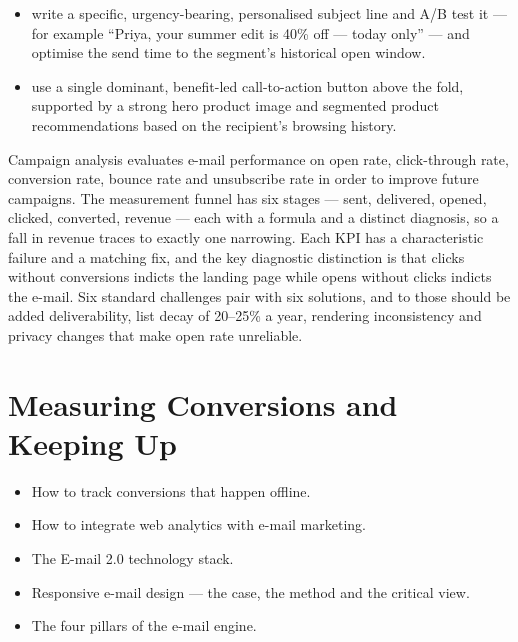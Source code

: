 \begin{exambox}
\begin{itemize}
\item {} write a specific, urgency-bearing,
      personalised subject line and A/B test it --- for example ``Priya, your
      summer edit is 40\% off --- today only'' --- and optimise the send time to
      the segment's historical open window.
\item {} use a single dominant, benefit-led
      call-to-action button above the fold, supported by a strong hero product
      image and segmented product recommendations based on the recipient's
      browsing history.
\end{itemize}
\end{exambox}

\begin{summarybox}
Campaign analysis evaluates e-mail performance on open rate, click-through rate,
conversion rate, bounce rate and unsubscribe rate in order to improve future
campaigns. The measurement funnel has six stages --- sent, delivered, opened,
clicked, converted, revenue --- each with a formula and a distinct diagnosis, so
a fall in revenue traces to exactly one narrowing. Each KPI has a characteristic
failure and a matching fix, and the key diagnostic distinction is that clicks
without conversions indicts the landing page while opens without clicks indicts
the e-mail. Six standard challenges pair with six solutions, and to those should
be added deliverability, list decay of 20--25\% a year, rendering inconsistency
and privacy changes that make open rate unreliable.
\end{summarybox}

\chapter{Measuring Conversions and Keeping Up}


\begin{learningoutcomes}
\begin{itemize}
\item How to track conversions that happen offline.
\item How to integrate web analytics with e-mail marketing.
\item The E-mail 2.0 technology stack.
\item Responsive e-mail design --- the case, the method and the critical view.
\item The four pillars of the e-mail engine.
\end{itemize}
\end{learningoutcomes}

